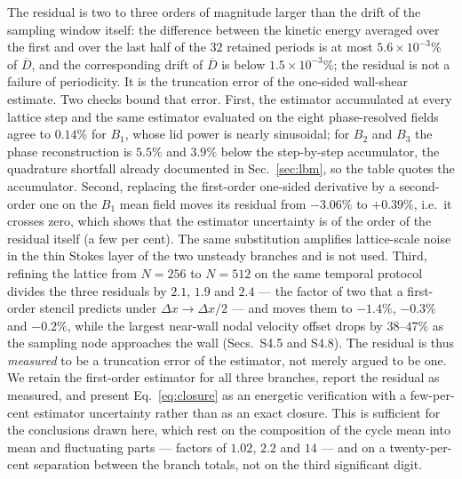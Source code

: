 \documentclass[11pt,a4paper]{article}
\newcommand{\Dbar}{\overline{D}}
\newenvironment{chgadd}{\par\color{blue}}{\par\color{black}}
\begin{document}
\begin{chgadd}
The residual is two to three orders of magnitude larger than the drift of the
sampling window itself: the difference between the kinetic energy averaged over the
first and over the last half of the $32$ retained periods is at most
$5.6\times10^{-3}\%$ of $\Dbar$, and the corresponding drift of $\Dbar$ is below
$1.5\times10^{-3}\%$; the residual is not a failure of periodicity. It is
the truncation error of the one-sided wall-shear estimate. Two checks bound that
error. First, the estimator accumulated at every lattice step and the same
estimator evaluated on the eight phase-resolved fields agree to $0.14\%$ for $B_1$,
whose lid power is nearly sinusoidal; for $B_2$ and $B_3$ the phase reconstruction
is $5.5\%$ and $3.9\%$ below the step-by-step accumulator, the quadrature shortfall
already documented in Sec.~\ref{sec:lbm}, so the table quotes the accumulator.
Second, replacing the first-order one-sided derivative by a second-order one on the
$B_1$ mean field moves its residual from $-3.06\%$ to $+0.39\%$, i.e.\ it crosses
zero, which shows that the estimator uncertainty is of the order of the residual
itself (a few per cent). The same substitution amplifies lattice-scale noise in the
thin Stokes layer of the two unsteady branches and is not used.
Third, refining the lattice from $N=256$ to $N=512$ on the same temporal protocol
divides the three residuals by $2.1$, $1.9$ and $2.4$ --- the factor of two that a
first-order stencil predicts under $\Delta x\to\Delta x/2$ --- and moves them to
$-1.4\%$, $-0.3\%$ and $-0.2\%$, while the largest near-wall nodal velocity
offset drops by $38$--$47\%$ as the sampling node approaches the wall (Secs.~S4.5 and S4.8). The residual is thus
\emph{measured} to be a truncation error of the estimator, not merely argued to be
one.
We retain the first-order
estimator for all three branches, report the residual as measured, and present
Eq.~\eqref{eq:closure} as an energetic verification with a few-per-cent estimator
uncertainty rather than as an exact closure. This is sufficient for the
conclusions drawn here, which rest on the composition of the cycle mean into mean
and fluctuating parts --- factors of $1.02$, $2.2$ and $14$ --- and on a
twenty-per-cent separation between the branch totals, not on the third significant
digit.


\end{chgadd}
\end{document}
